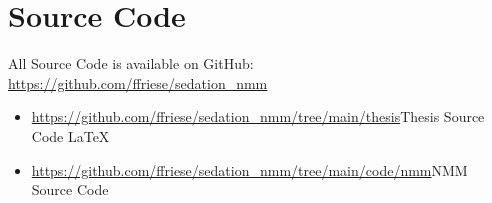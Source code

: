 \chapter{Source Code}\label{ch:source_code}

All Source Code is available on GitHub: \\
  \url{https://github.com/ffriese/sedation_nmm} \\
\begin{itemize}
    \item {} \url{https://github.com/ffriese/sedation_nmm/tree/main/thesis}{Thesis Source Code} \LaTeX\
    \item {} \url{https://github.com/ffriese/sedation_nmm/tree/main/code/nmm}{NMM Source Code}
    \faIcon{python}
\end{itemize}

